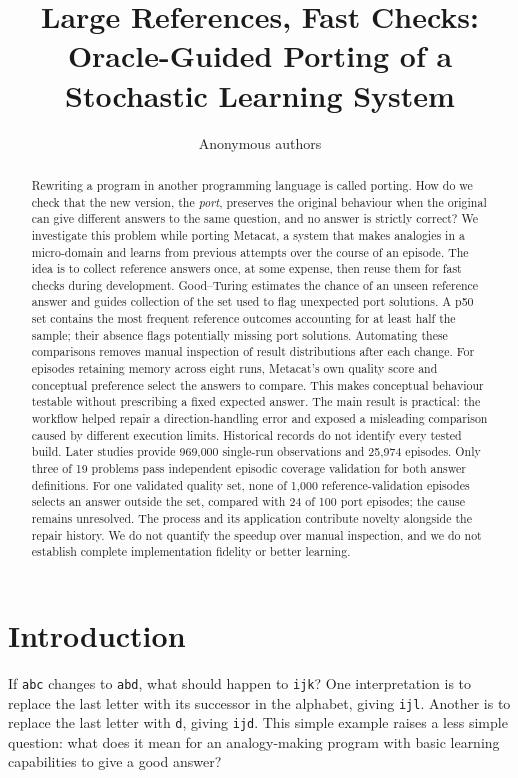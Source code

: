 \documentclass[10pt,letterpaper]{article}
\title{Large References, Fast Checks: Oracle-Guided Porting of a Stochastic Learning
System}
\author{Anonymous authors}
\begin{document}
\maketitle
\begin{abstract}
Rewriting a program in another programming language is called porting. How do we check
that the new version, the \emph{port}, preserves the original behaviour when the original
can give different answers to the same question, and no answer is strictly correct? We
investigate this problem while porting Metacat, a system that makes analogies in a
micro-domain and learns from previous attempts over the course of an episode. The idea is
to collect reference answers once, at some expense, then reuse them for fast checks during
development. Good--Turing estimates the chance of an unseen reference answer and guides
collection of the set used to flag unexpected port solutions. A p50 set contains the most
frequent reference outcomes accounting for at least half the sample; their absence flags
potentially missing port solutions. Automating these comparisons removes manual inspection
of result distributions after each change. For episodes retaining memory across eight
runs, Metacat's own quality score and conceptual preference select the answers to compare.
This makes conceptual behaviour testable without prescribing a fixed expected answer. The
main result is practical: the workflow helped repair a direction-handling error and
exposed a misleading comparison caused by different execution limits. Historical records
do not identify every tested build. Later studies provide 969,000 single-run observations
and 25,974 episodes. Only three of 19 problems pass independent episodic coverage
validation for both answer definitions. For one validated quality set, none of 1,000
reference-validation episodes selects an answer outside the set, compared with 24 of 100
port episodes; the cause remains unresolved. The process and its application contribute
novelty alongside the repair history. We do not quantify the speedup over manual
inspection, and we do not establish complete implementation fidelity or better learning.
\end{abstract}
\section{Introduction}\label{sec:introduction}

If \texttt{abc} changes to \texttt{abd}, what should happen to \texttt{ijk}? One
interpretation is to replace the last letter with its successor in the alphabet, giving
\texttt{ijl}. Another is to replace the last letter with \texttt{d}, giving \texttt{ijd}.
This simple example raises a less simple question: what does it mean for an analogy-making
program with basic learning capabilities to give a good answer?
\end{document}
